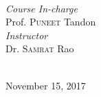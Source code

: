 \documentclass[12pt]{article}
\begin{document}
\begin{titlepage}
\begin{minipage}{0.4\textwidth}
\begin{flushleft}
\end{flushleft}
\end{minipage}
~
\begin{minipage}{0.4\textwidth}
\begin{flushright} \large
\emph{Course In-charge} \\
Prof. \textsc{Puneet} Tandon\\ [0.5cm]
\emph{Instructor} \\
Dr. \textsc{Samrat} Rao\\ %

\end{flushright}
\end{minipage}\\[2cm]



{\large November 15, 2017}\\[2cm] %


 

\vfill %

\end{titlepage}

\tableofcontents

\newpage
\end{document}

